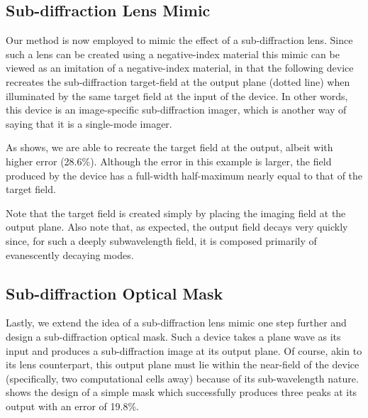\subsection{Sub-diffraction Lens Mimic}

Our method is now employed to mimic the effect of a sub-diffraction lens.
Since such a lens can be created using a negative-index material \cite{pendry}
    this mimic can be viewed as an imitation of a negative-index material,
    in that the following device recreates the sub-diffraction target-field 
    at the output plane (dotted line)
    when illuminated by the same target field at the input of the device.
In other words,
    this device is an image-specific sub-diffraction imager,
    which is another way of saying that it is a single-mode imager.

As  shows,
   we are able to recreate the target field at the output,
   albeit with higher error (28.6\%).
Although the error in this example is larger,
    the field produced by the device has a full-width half-maximum
    nearly equal to that of the target field.

Note that the target field is created simply by placing 
    the imaging field at the output plane.
Also note that, as expected, 
    the output field decays very quickly since,
    for such a deeply subwavelength field,
    it is composed primarily of evanescently decaying modes.



\subsection{Sub-diffraction Optical Mask}

Lastly, we extend the idea of a sub-diffraction lens mimic
    one step further and
    design a sub-diffraction optical mask.
Such a device takes a plane wave as its input and
    produces a sub-diffraction image at its output plane.
Of course, akin to its lens counterpart,
    this output plane must lie within the near-field 
    of the device (specifically, two computational cells away)
    because of its sub-wavelength nature.
     shows the design of a simple mask which 
    successfully produces three peaks at its output
    with an error of 19.8\%.
    
 

